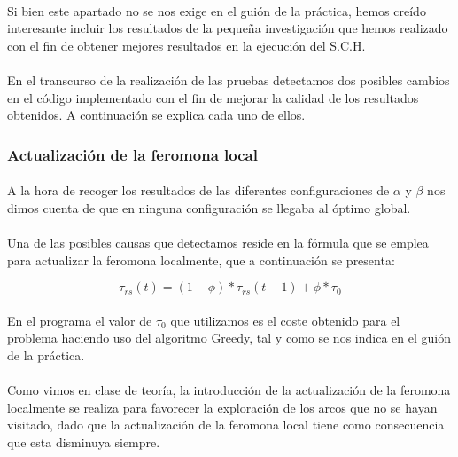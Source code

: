 	\paragraph{}Si bien este apartado no se nos exige en el guión de la práctica, hemos creído interesante incluir los resultados de la pequeña investigación que hemos realizado con el fin de obtener mejores resultados en la ejecución del S.C.H.
	
	\paragraph{}En el transcurso de la realización de las pruebas detectamos dos posibles cambios en el código implementado con el fin de mejorar la calidad de los resultados obtenidos. A continuación se explica cada uno de ellos.
	
	\subsubsection{Actualización de la feromona local} 
	
	\paragraph{}A la hora de recoger los resultados de las diferentes configuraciones de $\alpha$ y $\beta$ nos dimos cuenta de que en ninguna configuración se llegaba al óptimo global.
	
	\paragraph{}Una de las posibles causas que detectamos reside en la fórmula que se emplea para actualizar la feromona localmente, que a continuación se presenta:
	
	\begin{equation}
	\tau_{rs}(t) = (1-\phi)*\tau_{rs}(t-1)+\phi*\tau_{0}
	\end{equation}
	
	\paragraph{}En el programa el valor de $\tau_{0}$ que utilizamos es el coste obtenido para el problema haciendo uso del algoritmo Greedy, tal y como se nos indica en el guión de la práctica. 
	
	\paragraph{}Como vimos en clase de teoría, la introducción de la actualización de la feromona localmente se realiza para favorecer la exploración de los arcos que no se hayan visitado, dado que la actualización de la feromona local tiene como consecuencia que esta disminuya siempre.
	
